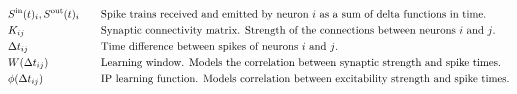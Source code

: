 \begin{alignat*}{2}
& {S^{\rm in}}(t)_i, {S^{\rm out}}(t)_i \quad &&\text{Spike trains received and emitted by neuron $i$ as a sum of delta functions in time.}\\ 
& K_{ij} &&\text{Synaptic connectivity matrix. Strength of the connections between neurons $i$ and $j$.}\\
& \Delta t_{ij} &&\text{Time difference between spikes of neurons $i$ and $j$.}\\
& W(\Delta t_{ij}) &&\text{Learning window. Models the correlation between synaptic strength and spike times.}\\ 
& \phi(\Delta t_{ij}) &&\text{IP learning function. Models correlation between excitability strength and spike times.}\\ 
\end{alignat*}
